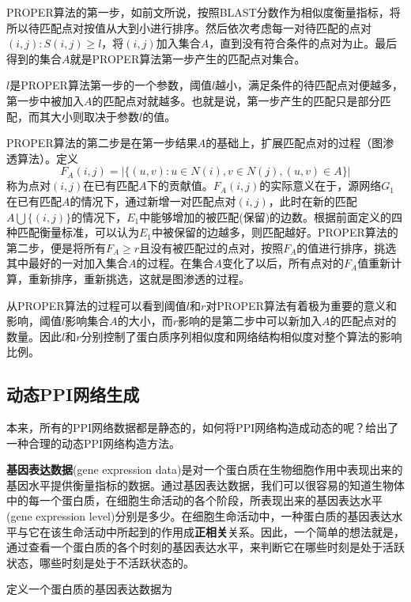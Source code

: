 PROPER算法的第一步，如前文所说，按照BLAST分数作为相似度衡量指标，将所以待匹配点对按值从大到小进行排序。然后依次考虑每一对待匹配的点对$(i,j):S(i,j)\geq l$，将$(i,j)$加入集合$A$，直到没有符合条件的点对为止。最后得到的集合$A$就是PROPER算法第一步产生的匹配点对集合。

$l$是PROPER算法第一步的一个参数，阈值$l$越小，满足条件的待匹配点对便越多，第一步中被加入$A$的匹配点对就越多。也就是说，第一步产生的匹配只是部分匹配，而其大小则取决于参数$l$的值。

PROPER算法的第二步是在第一步结果$A$的基础上，扩展匹配点对的过程（图渗透算法）。定义
\begin{equation}\label{proper2}
F_A(i,j)=\left | \{(u,v):u\in N(i),v\in N(j),(u,v)\in A\} \right |
\end{equation}
称为点对$(i,j)$在已有匹配$A$下的贡献值。$F_A(i,j)$的实际意义在于，源网络$G_1$在已有匹配$A$的情况下，通过新增一对匹配点对$(i,j)$，此时在新的匹配$A\bigcup \{(i,j)\}$的情况下，$E_1$中能够增加的被匹配(保留)的边数。根据前面定义的四种匹配衡量标准，可以认为$E_1$中被保留的边越多，则匹配越好。PROPER算法的第二步，便是将所有$F_A\geq r$且没有被匹配过的点对，按照$F_A$的值进行排序，挑选其中最好的一对加入集合$A$的过程。在集合$A$变化了以后，所有点对的$F_A$值重新计算，重新排序，重新挑选，这就是图渗透的过程。

从PROPER算法的过程可以看到阈值$l$和$r$对PROPER算法有着极为重要的意义和影响，阈值$l$影响集合$A$的大小，而$r$影响的是第二步中可以新加入$A$的匹配点对的数量。因此$l$和$r$分别控制了蛋白质序列相似度和网络结构相似度对整个算法的影响比例。

\subsection{动态PPI网络生成}
本来，所有的PPI网络数据都是静态的，如何将PPI网络构造成动态的呢？\cite{zhang2016method}给出了一种合理的动态PPI网络构造方法。

\textbf{基因表达数据}(gene expression data)是对一个蛋白质在生物细胞作用中表现出来的基因水平提供衡量指标的数据。通过基因表达数据，我们可以很容易的知道生物体中的每一个蛋白质，在细胞生命活动的各个阶段，所表现出来的基因表达水平(gene expression level)分别是多少。在细胞生命活动中，一种蛋白质的基因表达水平与它在该生命活动中所起到的作用成\textbf{正相关}关系。因此，一个简单的想法就是，通过查看一个蛋白质的各个时刻的基因表达水平，来判断它在哪些时刻是处于活跃状态，哪些时刻是处于不活跃状态的。

定义一个蛋白质的基因表达数据为

